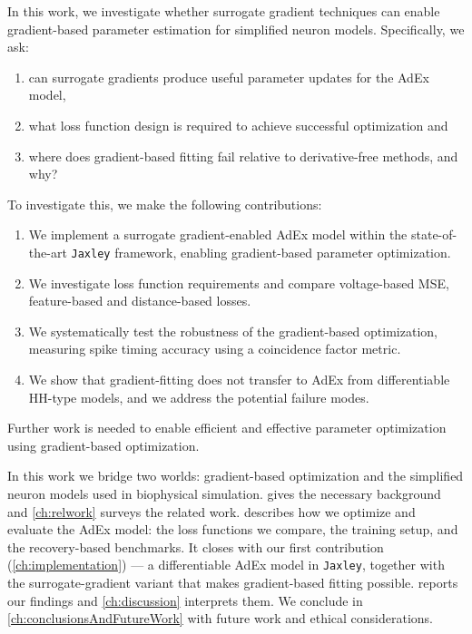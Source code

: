 In this work, we investigate whether surrogate gradient techniques can enable gradient-based parameter estimation for simplified neuron models.
Specifically, we ask:
\begin{enumerate}
  \item can surrogate gradients produce useful parameter updates for the \gls{AdEx} model,
  \item what loss function design is required to achieve successful optimization and
  \item where does gradient-based fitting fail relative to derivative-free methods, and why?
\end{enumerate}
To investigate this, we make the following contributions:
\begin{enumerate}
  \item We implement a surrogate gradient-enabled \gls{AdEx} model within the state-of-the-art \texttt{Jaxley} framework, enabling gradient-based parameter optimization.
  \item We investigate loss function requirements and compare voltage-based \gls{MSE}, feature-based and distance-based losses.
  \item We systematically test the robustness of the gradient-based optimization, measuring spike timing accuracy using a coincidence factor metric.
  \item We show that gradient-fitting does not transfer to \gls{AdEx} from differentiable \gls{HH}-type models, and we address the potential failure modes.
\end{enumerate}
Further work is needed to enable efficient and effective parameter optimization using gradient-based optimization.

In this work we bridge two worlds: gradient-based optimization and the simplified neuron models used in biophysical simulation.
 gives the necessary background and \cref{ch:relwork} surveys the related work.
 describes how we optimize and evaluate the \gls{AdEx} model: the loss functions we compare, the training setup, and the recovery-based benchmarks.
It closes with our first contribution (\cref{ch:implementation}) --- a differentiable \gls{AdEx} model in \texttt{Jaxley}, together with the surrogate-gradient variant that makes gradient-based fitting possible.
 reports our findings and \cref{ch:discussion} interprets them.
We conclude in \cref{ch:conclusionsAndFutureWork} with future work and ethical considerations.
